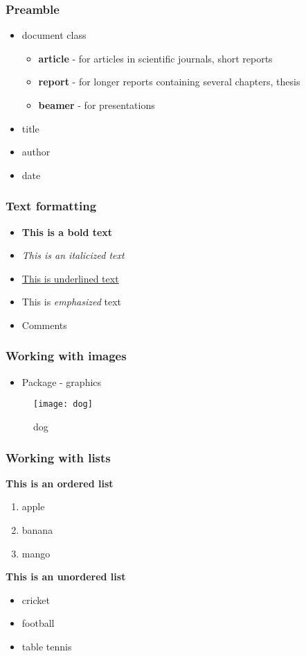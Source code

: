 \documentclass{beamer}
\begin{document}
\begin{frame}
\frametitle{Preamble}
\begin{itemize}
\item document class
\begin{itemize}
\item \textbf{article} - for articles in scientific journals, short reports
\item \textbf{report} - for longer reports containing several chapters, thesis
\item \textbf{beamer} - for presentations
\end{itemize}
\item title
\item author
\item date
\end{itemize}
\end{frame}
\begin{frame}
\frametitle{Text formatting}
\begin{itemize}
\item \textbf{This is a bold text}
\item \textit{This is an italicized text}
\item \underline{This is underlined text}
\item This is \emph{emphasized} text
\item Comments
\end{itemize}
\end{frame}
\begin{frame}
\frametitle{Working with images}
\begin{itemize}
\item Package - graphics
\end{itemize}
\begin{figure}
\texttt{[image: dog]}
\caption{dog}
\end{figure}
\end{frame}
\begin{frame}
\frametitle{Working with lists}
\textbf{This is an ordered list}
\begin{enumerate}
\item apple
\item banana
\item mango
\end{enumerate}
\textbf{This is an unordered list}
\begin{itemize}
\item cricket
\item football
\item table tennis
\end{itemize}
\end{frame}
\end{document}
